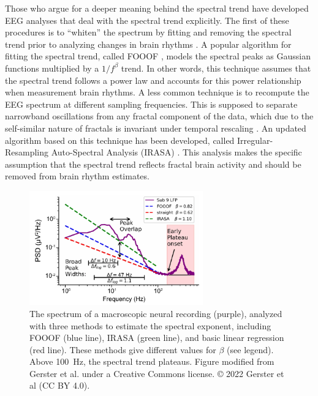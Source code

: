 Those who argue for a deeper meaning behind the spectral trend have developed EEG analyses that deal with the spectral trend explicitly. The first of these procedures is to ``whiten'' the spectrum by fitting and removing the spectral trend prior to analyzing changes in brain rhythms \cite{Buzsaki2004,Buzsaki2006,Donoghue2020}. A popular algorithm for fitting the spectral trend, called FOOOF \cite{Donoghue2020}, models the spectral peaks as Gaussian functions multiplied by a $1/f^\beta$ trend. In other words, this technique assumes that the spectral trend follows a power law and accounts for this power relationship when measurement brain rhythms. A less common technique is to recompute the EEG spectrum at different sampling frequencies. This is supposed to separate narrowband oscillations from any fractal component of the data, which due to the self-similar nature of fractals is invariant under temporal rescaling \cite{Yamamoto1993}. An updated algorithm based on this technique has been developed, called Irregular-Resampling Auto-Spectral Analysis (IRASA) \cite{Wen2016}. This analysis makes the specific assumption that the spectral trend reflects fractal brain activity and should be removed from brain rhythm estimates.

\begin{figure}
\vspace{-15pt}
\includegraphics[width=75mm]{Figures/chapter1/gerster.pdf}
\vspace{-10pt}
\caption{  The spectrum of a macroscopic neural recording (purple), analyzed with three methods to estimate the spectral exponent, including FOOOF (blue line), IRASA (green line), and basic linear regression (red line). These methods give different values for $\beta$ (see legend). Above \qty{100}{\hertz}, the spectral trend plateaus. Figure modified from Gerster et al. \cite{Gerster2022} under a Creative Commons license. © 2022 Gerster et al (CC BY 4.0).
} \label{fig:gerster}
\end{figure}

